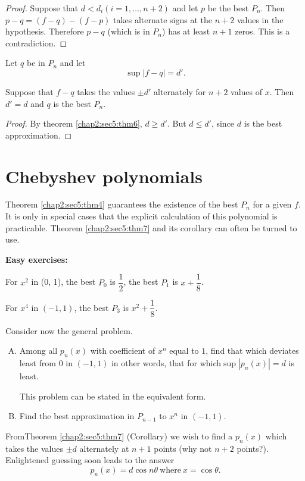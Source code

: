 \begin{proof}
  Suppose that $d<d_i (i=1, \ldots, n+2)$ and let $p$ be the best
  $P_n$. Then $p-q=(f-q)-(f-p)$ takes alternate signs at the $n+2$
  values in the hypothesis. Therefore $p-q$ (which is in $P_n$) has
  at least $n+1$ zeros. This is a contradiction. 
\end{proof}

\begin{coro*}
  Let $q$ be in $P_n$ and let
  $$
  \sup |f-q|=d'.
  $$
\end{coro*}

Suppose that $f-q$ takes the values $\pm d'$ alternately for $n+2$
values of $x$. Then $d'=d$ and $q$ is the best $P_n$. 

\begin{proof}
  By theorem \ref{chap2:sec5:thm6}, $d\geq d'$. But $d\leq d'$, since $d$ is the best
  approximation. 
\end{proof}

\section{Chebyshev polynomials}\label{chap2:sec6}

Theorem \ref{chap2:sec5:thm4} guarantees the existence of the best $P_n$ for a given
$f$. It is only in special cases that the explicit calculation of
this polynomial is practicable. Theorem \ref{chap2:sec5:thm7} and its corollary can
often be turned to use. 
 
\noindent
\textbf{Easy exercises:}

For $x^2$ in (0, 1), the best $P_0$ is $\dfrac{1}{2}$, the best $P_1$
is $x+ \dfrac{1}{8}$.  

For $x^4$ in $(-1, 1)$, the best $P_3$ is $x^2+ \dfrac{1}{8}$.

Consider now the general problem.
\begin{enumerate}[A.]
\item Among all $p_n(x)$ with coefficient of $x^n$ equal to $1$, find
  that which deviates least from $0$ in $(-1,1)$ in other words, that
  for which\break $\sup |p_n(x)|=d$ is least. 

  This problem can be stated in the equivalent form.

\item Find the best approximation in $P_{n-1}$ to $x^n$ in $(-1,1)$.
\end{enumerate}

From\pageoriginale Theorem \ref{chap2:sec5:thm7} (Corollary) we wish to find a $p_n(x)$ which takes
the values $\pm d$ alternately at $n+1$ points (why not $n+2$
points?). Enlightened guessing soon leads to the answer 
$$
p_n(x)=d \cos n \theta ~\text{where}~ x=\cos \theta.
$$

